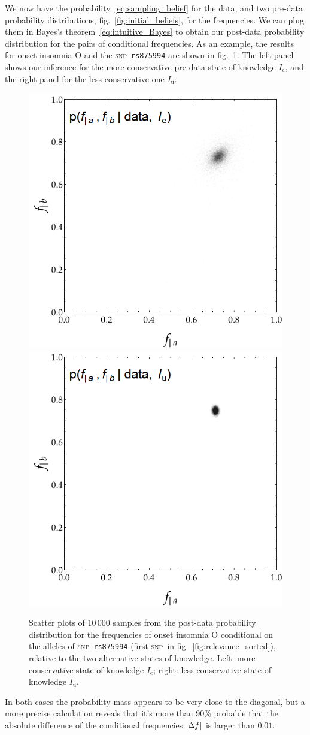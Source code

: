 \documentclass[\ifafour a4paper,12pt,\else a5paper,10pt,\fi%
onecolumn,oneside,article,%
british%
]{memoir}
\theoremstyle{remark}
\theoremstyle{innote}
\DeclarePairedDelimiter\abs{\lvert}{\rvert}
\renewcommand*{\|}[1][]{\nonscript\,#1\vert\nonscript\;\mathopen{}}
\newcommand*{\fig}{fig.}%
\newcommand*{\snp}{\textsc{snp}}
\newcommand*{\yI}{I}
\newcommand*{\yIu}{\yI_\text{u}}
\newcommand*{\yIc}{\yI_\text{c}}
\newcommand*{\ysO}{\textrm{O}}%
\newcommand*{\df}{\Delta f}
\begin{document}
We now have the probability~\eqref{eq:sampling_belief} for the data, and
two pre-data probability distributions, \fig~\ref{fig:initial_beliefs}, for
the frequencies. We can plug them in Bayes's
theorem~\eqref{eq:intuitive_Bayes} to obtain our post-data probability
distribution for the pairs of conditional frequencies. As an example, the
results for onset insomnia $\ysO$ and the \snp\ \texttt{rs875994} are shown
in \fig~\ref{fig:final_beliefs}. The left panel shows our inference for the
more conservative pre-data state of knowledge $\yIc$, and the right panel
for the less conservative one $\yIu$.
\begin{figure}[t!]%
 \centering\includegraphics[width=0.49\linewidth]{cons_post_list.png}%
 \includegraphics[width=0.49\linewidth]{unif_post_list.png}
 \caption{Scatter plots of 10\,000 samples from the post-data probability
   distribution for the frequencies of onset insomnia $\ysO$ conditional on
   the alleles of \snp\ \texttt{rs875994}%
   (first \snp\ in \fig~\ref{fig:relevance_sorted}), relative to the two
   alternative states of knowledge. Left: more conservative state of
   knowledge $\yIc$; right: less conservative state of knowledge
   $\yIu$.}\label{fig:final_beliefs}
\end{figure}
In both cases the probability mass appears to be very close to the
diagonal, but a more precise calculation reveals that it's more than 90\%
probable that the absolute difference of the conditional frequencies
$\abs{\df}$ is larger than $0.01$.
\end{document}
